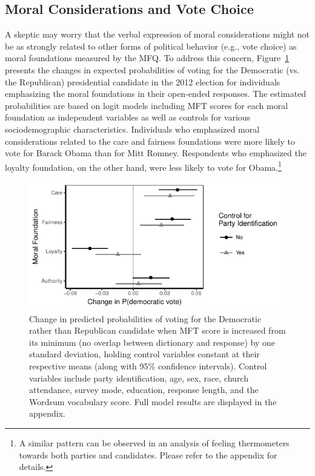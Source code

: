\documentclass[12pt]{article}
\begin{document}
\subsection*{Moral Considerations and Vote Choice}

A skeptic may worry that the verbal expression of moral considerations might not be as strongly related to other forms of political behavior (e.g., vote choice) as moral foundations measured by the MFQ. To address this concern, Figure~\ref{fig:logit_vote} presents the changes in expected probabilities of voting for the Democratic (vs. the Republican) presidential candidate in the 2012 election for individuals emphasizing the moral foundations in their open-ended responses. The estimated probabilities are based on logit models including MFT scores for each moral foundation as independent variables as well as controls for various sociodemographic characteristics. Individuals who emphasized moral considerations related to the care and fairness foundations were more likely to vote for Barack Obama than for Mitt Romney. Respondents who emphasized the loyalty foundation, on the other hand, were less likely to vote for Obama.\footnote{A similar pattern can be observed in an analysis of feeling thermometers towards both parties and candidates. Please refer to the appendix for details.}

\begin{figure}[ht]\centering
\includegraphics[scale=.9]{../calc/fig/logit_vote.pdf}
\caption{Change in predicted probabilities of voting for the Democratic rather than Republican candidate when MFT score is increased from its minimum (no overlap between dictionary and response) by one standard deviation, holding control variables constant at their respective means (along with 95\% confidence intervals). Control variables include party identification, age, sex, race, church attendance, survey mode, education, response length, and the Wordsum vocabulary score. Full model results are displayed in the appendix.
}\label{fig:logit_vote}
\end{figure}
\end{document}

